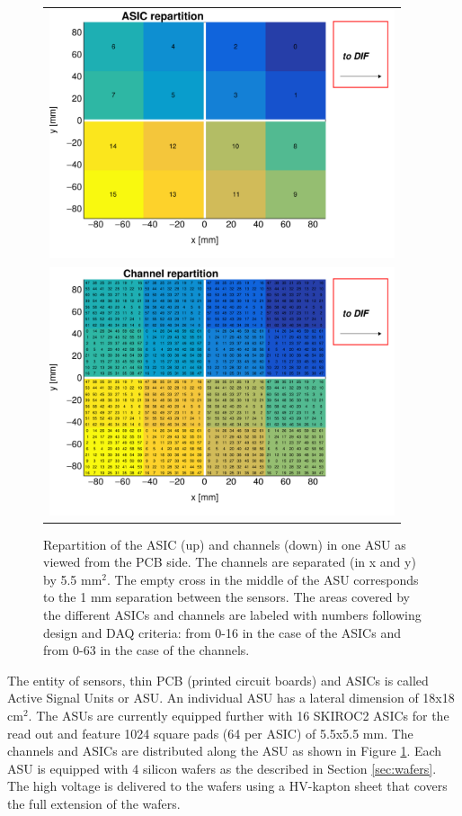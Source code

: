 \documentclass[a4paper,11pt]{article}
\begin{document}
\begin{figure}[!t]
  \centering
  \begin{tabular}{l}
    \includegraphics[width=4in]{ASU_geometry1-eps-converted-to.pdf}  \\
    \includegraphics[width=4in]{ASU_geometry2-eps-converted-to.pdf}  \\
  \end{tabular}
  \caption{Repartition of the ASIC (up) and channels (down) in one ASU as viewed from the PCB side.
    The channels are separated (in x and y) by 5.5 mm$^{2}$.
    The empty cross in the middle of the ASU corresponds to the 1 mm separation between the sensors.
    The areas covered by the different ASICs and channels
    are labeled with numbers following design and DAQ criteria: from 0-16 in the case of the ASICs and from 0-63 in the case of the channels.
  }
\label{ASU}
\end{figure}

The entity
of sensors, thin PCB (printed circuit boards) and ASICs is called Active Signal Units or ASU.
An individual ASU has a lateral dimension of 18x18 cm$^{2}$.
The ASUs are currently equipped
further with 16 SKIROC2 ASICs for the read out and feature 1024 square pads (64 per ASIC) of 5.5x5.5 mm.
The channels and ASICs are distributed along the ASU as shown in Figure \ref{ASU}. Each ASU is equipped with 4 silicon wafers as the described in Section \ref{sec:wafers}.
The high voltage is delivered to the wafers using a HV-kapton sheet that covers the full extension of the wafers.
\end{document}
